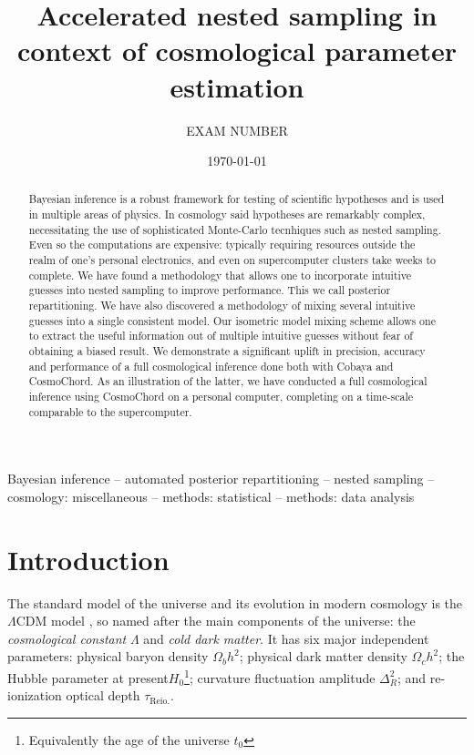 \documentclass[usenatbib]{mnras}
\author[TODO exam number]{
  EXAM NUMBER
}
\date{\today}
\title[Accelerated Nested Sampling]{Accelerated nested sampling in context of cosmological parameter estimation}
\begin{document}
\maketitle
\begin{abstract}
  Bayesian inference is a robust framework for testing of scientific
  hypotheses and is used in multiple areas of physics. In cosmology
  said hypotheses are remarkably complex, necessitating the use of
  sophisticated Monte-Carlo tecnhiques such as nested sampling. Even
  so the computations are expensive: typically requiring resources
  outside the realm of one's personal electronics, and even on
  supercomputer clusters take weeks to complete. We have found a
  methodology that allows one to incorporate intuitive guesses into
  nested sampling to improve performance. This we call posterior
  repartitioning. We have also discovered a methodology of mixing
  several intuitive guesses into a single consistent model. Our
  isometric model mixing scheme allows one to extract the useful
  information out of multiple intuitive guesses without fear of
  obtaining a biased result. We demonstrate a significant uplift in
  precision, accuracy and performance of a full cosmological inference
  done both with Cobaya and CosmoChord. As an illustration of the
  latter, we have conducted a full cosmological inference using
  CosmoChord on a personal computer, completing on a time-scale
  comparable to the supercomputer.
\end{abstract}

\begin{keywords}
Bayesian inference -- automated posterior repartitioning -- nested sampling -- cosmology: miscellaneous -- methods: statistical -- methods: data analysis
\end{keywords}

\section{Introduction}\label{sec:org14413d7}

The standard model of the universe and its evolution in modern
cosmology is the \(\Lambda\)CDM model \citep{Condon2018}, so named
after the main components of the universe: the \emph{cosmological
  constant} \(\Lambda\) and \emph{cold dark matter}. It has six major
independent parameters: physical baryon density \(\Omega_{b}h^{2}\);
physical dark matter density \(\Omega_{c}h^{2}\); the Hubble parameter
at present\(H_{0}\)\footnote{Equivalently the age of the universe
  \(t_0\)}; curvature fluctuation amplitude \(\Delta_{R}^{2}\); and
re-ionization optical depth \(\tau_\text{Reio.}\).
\end{document}
